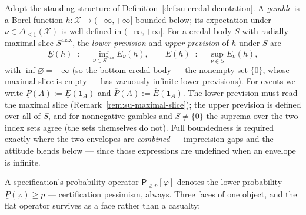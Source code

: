 \begin{definition}
\label{def:su-previsions}
Adopt the standing structure of
Definition~\ref{def:su-credal-denotation}. A \emph{gamble} is a
Borel function $h \colon \mathcal{X} \to (-\infty, +\infty]$ bounded
below; its expectation under $\nu \in \Delta_{\le 1}(\mathcal{X})$
is well-defined in $(-\infty, +\infty]$. For a credal body $S$
with radially maximal slice $S^{\max}$, the \emph{lower prevision}
and \emph{upper prevision} of $h$ under $S$ are
\[
  \underline{E}(h) \;:=\; \inf_{\nu \in S^{\max}} E_\nu(h), \qquad
  \overline{E}(h) \;:=\; \sup_{\nu \in S} E_\nu(h),
\]
with $\inf \varnothing = +\infty$ (so the bottom credal body ---
the nonempty set $\{0\}$, whose maximal slice is empty --- has
vacuously infinite lower previsions). For events we write
$\underline{P}(A) := \underline{E}(\mathbf{1}_A)$ and
$\overline{P}(A) := \overline{E}(\mathbf{1}_A)$. The lower prevision
must read the maximal slice
(Remark~\ref{rem:su-maximal-slice}); the upper prevision is defined
over all of $S$, and for nonnegative gambles and $S \ne \{0\}$ the
suprema over the two index sets agree (the sets themselves do not). Full boundedness is required exactly where the two envelopes
are \emph{combined} --- imprecision gaps and the attitude blends
below --- since those expressions are undefined when an envelope is
infinite.
\end{definition}

A specification's probability operator
$\mathsf{P}_{\ge p}[\varphi]$ denotes the lower probability
$\underline{P}(\varphi) \ge p$ --- certification pessimism, always.
Three faces of one object, and the flat operator survives as a face
rather than a casualty:

